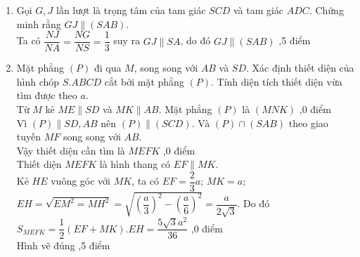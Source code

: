 \begin{bt}
{\begin{enumerate}
			Vì $AD \parallel BC$ nên giao tuyến của $(SAD)$ và $(SBC)$ là $Sx \parallel AD \parallel BC$ ,5 điểm
			\item Gọi $G, J$  lần lượt là trọng tâm của tam giác $SCD$ và tam giác $ADC$. Chứng minh rằng $GJ \parallel (SAB)$.\\
			Ta có $\dfrac{NJ}{NA}=\dfrac{NG}{NS}=\dfrac{1}{3}$ suy ra $GJ \parallel SA$, do đó $GJ \parallel (SAB)$ ,5 điểm
			\item Mặt phẳng $(P)$ đi qua $M$, song song với $AB$ và $SD$. Xác định thiết diện của hình chóp $S.ABCD$ cắt bởi mặt phẳng $(P)$. Tính diện tích thiết diện vừa tìm được theo $a$.\\
			Từ $M$ kẻ $ME \parallel SD$ và $MK \parallel AB$. Mặt phẳng $(P)$ là $(MNK)$ ,0 điểm\\
			Vì $(P) \parallel SD, AB$ nên $(P) \parallel (SCD)$. Và
			$(P) \cap (SAB)$ theo giao tuyến $MF$ song song với $AB$. \\Vậy thiết diện cần tìm là $MEFK$ ,0 điểm\\
			Thiết diện $MEFK$ là hình thang có $EF \parallel MK$.\\
			Kẻ $HE$ vuông góc với $MK$, ta có $EF=\dfrac{2}{3}a$; $MK=a$; $EH=\sqrt{EM^2=MH^2}=\sqrt{\left(\dfrac{a}{3}\right)^2-\left(\dfrac{a}{6}\right)^2}=\dfrac{a}{2\sqrt{3}}$. Do đó $S_{MEFK}=\dfrac{1}{2}(EF+MK).EH=\dfrac{5\sqrt{3}a^2}{36}$ ,0 điểm\\
			Hình vẽ đúng ,5 điểm
		\end{enumerate}
		
	}
\end{bt}
